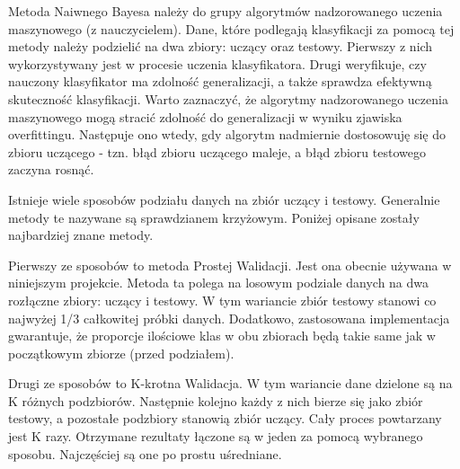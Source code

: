 Metoda Naiwnego Bayesa należy do grupy algorytmów nadzorowanego uczenia maszynowego (z nauczycielem). Dane, które podlegają klasyfikacji za pomocą tej metody należy podzielić na dwa zbiory: uczący oraz testowy. Pierwszy z nich wykorzystywany jest w procesie uczenia klasyfikatora. Drugi weryfikuje, czy nauczony klasyfikator ma zdolność generalizacji, a także sprawdza efektywną skuteczność klasyfikacji. Warto zaznaczyć, że algorytmy nadzorowanego uczenia maszynowego mogą stracić zdolność do generalizacji w wyniku zjawiska overfittingu. Następuje ono wtedy, gdy algorytm nadmiernie dostosowuję się do zbioru uczącego - tzn. błąd zbioru uczącego maleje, a błąd zbioru testowego zaczyna rosnąć.

Istnieje wiele sposobów podziału danych na zbiór uczący i testowy. Generalnie metody te nazywane są sprawdzianem krzyżowym. Poniżej opisane zostały najbardziej znane metody.

Pierwszy ze sposobów to metoda Prostej Walidacji. Jest ona obecnie używana w niniejszym projekcie. Metoda ta  polega na losowym podziale danych na dwa rozłączne zbiory: uczący i testowy. W tym wariancie zbiór testowy  stanowi co najwyżej 1/3 całkowitej próbki danych. Dodatkowo, zastosowana implementacja gwarantuje, że proporcje  ilościowe klas w obu zbiorach będą takie same jak w początkowym zbiorze (przed podziałem).

Drugi ze sposobów to K-krotna Walidacja. W tym wariancie dane dzielone są na K różnych podzbiorów. Następnie kolejno każdy z nich bierze się jako zbiór testowy, a pozostałe podzbiory stanowią zbiór uczący. Cały proces powtarzany jest K razy. Otrzymane rezultaty łączone są w jeden za pomocą wybranego sposobu. Najczęściej są one po prostu uśredniane.
